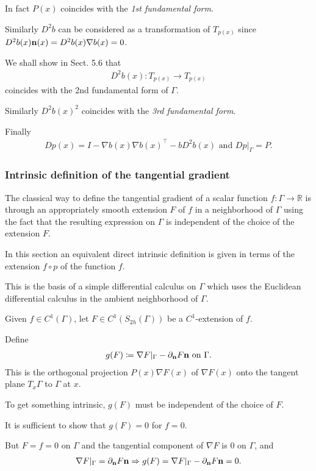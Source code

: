 \documentclass[oneside]{book}
\numberwithin{equation}{section}
\begin{document}
In fact $P(x)$ coincides with the \textit{1st fundamental form}.

Similarly $D^2b$ can be considered as a transformation of $T_{p(x)}$ since $D^2b(x){\bf n}(x) = D^2b(x)\nabla b(x) = 0$.

We shall show in Sect. 5.6 that
\begin{align*}
    D^2b(x):T_{p(x)}\to T_{p(x)}
\end{align*}
coincides with the 2nd fundamental form of $\Gamma$.

Similarly $D^2b(x)^2$ coincides with the \textit{3rd fundamental form}.

Finally
\begin{align*}
    Dp(x) = I - \nabla b(x)\nabla b(x)^\top - bD^2b(x) \mbox{ and } Dp|_\Gamma = P.
\end{align*}

\subsubsection{Intrinsic definition of the tangential gradient}
The classical way to define the tangential gradient of a scalar function $f:\Gamma\to\mathbb{R}$ is through an appropriately smooth extension $F$ of $f$ in a neighborhood of $\Gamma$ using the fact that the resulting expression on $\Gamma$ is independent of the choice of the extension $F$.

In this section an equivalent direct intrinsic  definition is given in terms of the extension $f\circ p$ of the function $f$.

This is the basis of a simple differential calculus on $\Gamma$ which uses the Euclidean differential calculus in the ambient neighborhood of $\Gamma$.

%
Given $f\in C^1(\Gamma)$, let $F\in C^1(S_{2h}(\Gamma))$ be a $C^1$-extension of $f$.

Define
\begin{align*}
    g(F)\coloneqq\nabla F|_\Gamma - \partial_{\bf n}F{\bf n} \mbox{ on } \Gamma.
\end{align*}
This is the orthogonal projection $P(x)\nabla F(x)$ of $\nabla F(x)$ onto the tangent plane $T_x\Gamma$ to $\Gamma$ at $x$.

To get something intrinsic, $g(F)$ must be independent of the choice of $F$.

It is sufficient to show that $g(F) = 0$ for $f = 0$.

But $F = f = 0$ on $\Gamma$ and the tangential component of $\nabla F$ is 0 on $\Gamma$, and
\begin{align*}
    \nabla F|_\Gamma = \partial_{\bf n}F{\bf n}\Rightarrow g(F) = \nabla F|_\Gamma - \partial_{\bf n}F{\bf n} = 0.
\end{align*}
\end{document}
